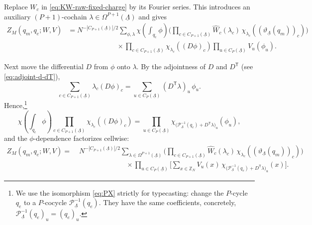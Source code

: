 \documentclass[dvipsnames,a4paper]{article}
\numberwithin{equation}{section}
\theoremstyle{definition}
\theoremstyle{remark}
\begin{document}
Replace \(W_c\) in \eqref{eq:KW-raw-fixed-charge} by its Fourier series. This introduces an
auxiliary \((P+1)\)-cochain $\lambda\in \Omega^{P+1}(\underline\Lambda)$ and gives
\begin{equation}
	\begin{aligned}
		Z_M(q_m,q_e;W,V)
		&=
		N^{-|C_{P+1}(\underline\Lambda)|/2}
		\sum_{\phi,\lambda}
		\chi \left(\int_{q_e}\phi\right)
		\Biggl(
		\prod_{c\in C_{P+1}(\underline\Lambda)}
		\widehat W_c(\lambda_c)\,
		\chi_{\lambda_c} \left((\vartheta_{\underline\Lambda}(q_m))_c\right)
		\Biggr)
		\\
		&\hspace{7em}\times
		\prod_{c\in C_{P+1}(\underline\Lambda)}
		\chi_{\lambda_c} \left((D\phi)_c\right)
		\prod_{u\in C_P(\underline\Lambda)}V_u(\phi_u).
	\end{aligned}
	\label{eq:KW-step1}
\end{equation}

Next move the differential \(D\) from \(\phi\) onto \(\lambda\). By the adjointness of
\(D\) and \(D^{\mathsf T}\) (see \eqref{eq:adjoint-d-dT}),
\begin{equation}
	\sum_{c\in C_{P+1}(\underline\Lambda)}\lambda_c(D\phi)_c
	=
	\sum_{u\in C_P(\underline\Lambda)}(D^{\mathsf T}\lambda)_u\,\phi_u.
	\label{eq:KW-adjointness}
\end{equation}
Hence,\footnote{We use the isomorphism \eqref{eq:PX} strictly for typecasting: change the $P$-cycle $q_e$ to a $P$-cocycle $\mathcal P^{-1}_{\underline\Lambda}(q_e)$. They have the same coefficients, concretely, $\mathcal P_{\underline\Lambda}^{-1}(q_e)_u = (q_e)_u$.}
\begin{equation}
	\chi \left(\int_{q_e}\phi\right)
	\prod_{c\in C_{P+1}(\underline\Lambda)}\chi_{\lambda_c} \left((D\phi)_c\right)
	=
	\prod_{u\in C_P(\underline\Lambda)}
	\chi_{\bigl(\mathcal P_{\underline\Lambda}^{-1}(q_e)+D^{\mathsf T}\lambda\bigr)_u}(\phi_u),
\end{equation}
and the \(\phi\)-dependence factorizes cellwise:
\begin{equation}
	\begin{aligned}
		Z_M(q_m,q_e;W,V)
		=&\;
		N^{-|C_{P+1}(\underline\Lambda)|/2}
		\sum_{\lambda\in \Omega^{P+1}(\underline\Lambda)}
		\Biggl(
		\prod_{c\in C_{P+1}(\underline\Lambda)}
		\widehat W_c(\lambda_c)\,
		\chi_{\lambda_c} \left((\vartheta_{\underline\Lambda}(q_m))_c\right)
		\Biggr)
		\\
		&\hspace{7em}\times
		\prod_{u\in C_P(\underline\Lambda)}
		\Biggl[
		\sum_{x\in \mathbb Z_N}
		V_u(x)\,\chi_{\bigl(\mathcal P_{\underline\Lambda}^{-1}(q_e)+D^{\mathsf T}\lambda\bigr)_u}(x)
		\Biggr].
	\end{aligned}
	\label{eq:KW-step2}
\end{equation}
\end{document}
